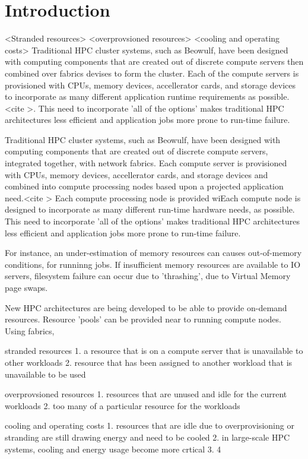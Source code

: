\section{Introduction}

<Stranded resources> <overprovsioned resources> <cooling and operating costs>
Traditional HPC cluster systems, such as Beowulf, have been designed with computing components that are created out of discrete compute servers then combined over fabrics devises to form the cluster.  Each of the compute servers is provisioned with CPUs, memory devices, accellerator cards, and storage devices to incorporate as many different application runtime requirements as possible.<cite >. This need to incorporate 'all of the options' makes traditional HPC architectures less efficient and application jobs more prone to run-time failure.  

Traditional HPC cluster systems, such as Beowulf, have been designed with computing components that are created out of discrete compute servers, integrated together, with network fabrics.  Each compute server is provisioned with CPUs, memory devices, accellerator cards, and storage devices and combined into compute processing nodes based upon a projected application need.<cite >  Each compute processing node is provided wiEach compute node is designed to incorporate as many different run-time hardware needs, as possible.  This need to incorporate 'all of the options' makes traditional HPC architectures less efficient and application jobs more prone to run-time failure.  

For instance, an under-estimation of memory resources can causes out-of-memory conditions, for runninng jobs.  If insufficient memory resources are available to IO servers, filesystem failure can occur due to 'thrashing', due to Virtual Memory page swaps.

New HPC architectures are being developed to be able to provide on-demand resources.  Resource 'pools' can be provided near to running compute nodes.  Using fabrics,  

stranded resources
  1.  a resource that is on a compute server that is unavailable to other workloads
  2.  resource that has been assigned to another workload that is unavailable to be used
 
 overprovsioned resources
  1.  resources that are unused and idle for the current workloads
  2.  too many of a particular resource for the workloads

cooling and operating costs
  1.  resources that are idle due to overprovisioning or stranding are still drawing energy and need to be cooled
  2.  in large-scale HPC systems, cooling and energy usage become more crtical 
  3.  4%
  

